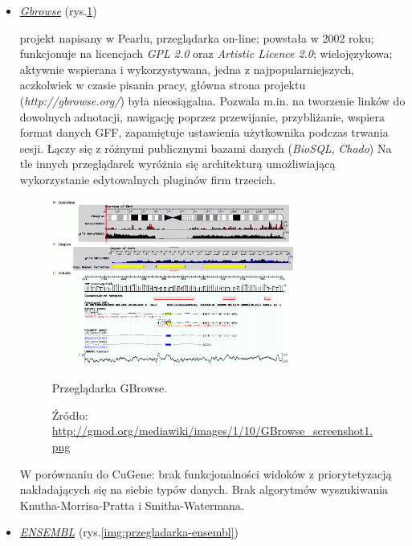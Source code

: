 \begin{itemize}
	\item \href{http://gbrowse.org}{\emph{Gbrowse}} (rys.\ref{img:przegladarka-gbrowse})
	\label{przegladarka-Gbrowse}
	
	projekt napisany w Pearlu, przeglądarka on-line; powstała w 2002 roku; funkcjonuje na licencjach \textit{GPL 2.0} oraz \textit{Artistic Licence 2.0}; wielojęzykowa; aktywnie wspierana i wykorzystywana, jedna z najpopularniejszych, aczkolwiek w czasie pisania pracy, główna strona projektu (\textit{http://gbrowse.org/}) była nieosiągalna. Pozwala m.in. na tworzenie linków do dowolnych adnotacji, nawigację poprzez przewijanie, przybliżanie, wspiera format danych GFF, zapamiętuje ustawienia użytkownika podczas trwania sesji. Łączy się z różnymi publicznymi bazami danych (\textit{BioSQL}, \textit{Chado}) Na tle innych przeglądarek wyróżnia się architekturą umożliwiającą wykorzystanie edytowalnych pluginów firm trzecich.
	\begin{figure}[h]
		\centering
		\includegraphics[width=0.75\textwidth]{img/browser-gbrowse.png}
		\caption{Przeglądarka GBrowse.}
		\vspace{-0.5cm}
		\caption*{\scriptsize Źródło: \url{http://gmod.org/mediawiki/images/1/10/GBrowse\_screenshot1.png}}
		\label{img:przegladarka-gbrowse}
	\end{figure}
	
	W porównaniu do CuGene:
	brak funkcjonalności widoków z priorytetyzacją nakładających się na siebie typów danych. Brak algorytmów wyszukiwania Knutha-Morrisa-Pratta i Smitha-Watermana.	
	\\
	
	\item \href{http://www.ensembl.org}{\emph{ENSEMBL}} \label{przegladarka-ENSEMBL} (rys.\ref{img:przegladarka-ensembl})
	

\end{itemize}
